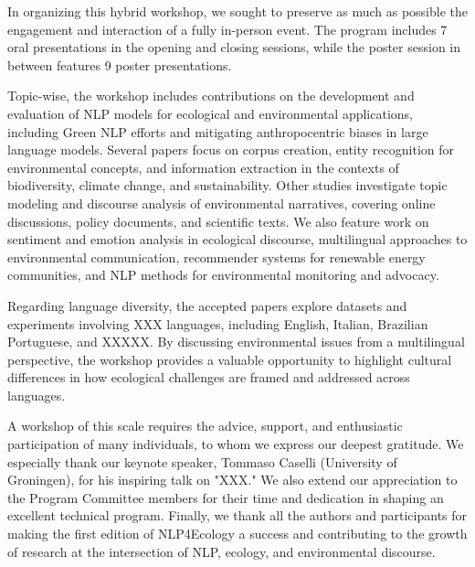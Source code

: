 In organizing this hybrid workshop, we sought to preserve as much as possible the engagement and interaction of a fully in-person event. The program includes 7 oral presentations in the opening and closing sessions, while the poster session in between features 9 poster presentations.

Topic-wise, the workshop includes contributions on the development and evaluation of NLP models for ecological and environmental applications, including Green NLP efforts and mitigating anthropocentric biases in large language models. Several papers focus on corpus creation, entity recognition for environmental concepts, and information extraction in the contexts of biodiversity, climate change, and sustainability. Other studies investigate topic modeling and discourse analysis of environmental narratives, covering online discussions, policy documents, and scientific texts. We also feature work on sentiment and emotion analysis in ecological discourse, multilingual approaches to environmental communication, recommender systems for renewable energy communities, and NLP methods for environmental monitoring and advocacy.

Regarding language diversity, the accepted papers explore datasets and experiments involving XXX languages, including English, Italian, Brazilian Portuguese, and XXXXX. By discussing environmental issues from a multilingual perspective, the workshop provides a valuable opportunity to highlight cultural differences in how ecological challenges are framed and addressed across languages.

A workshop of this scale requires the advice, support, and enthusiastic participation of many individuals, to whom we express our deepest gratitude. We especially thank our keynote speaker, Tommaso Caselli (University of Groningen), for his inspiring talk on "XXX." We also extend our appreciation to the Program Committee members for their time and dedication in shaping an excellent technical program. Finally, we thank all the authors and participants for making the first edition of NLP4Ecology a success and contributing to the growth of research at the intersection of NLP, ecology, and environmental discourse.
